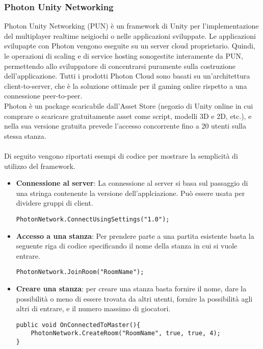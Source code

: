 \subsubsection{Photon Unity Networking}
Photon Unity Networking (PUN) \`e un framework di Unity per l'implementazione del multiplayer realtime neigiochi o nelle applicazioni sviluppate. Le applicazioni svilupapte con Photon vengono eseguite su un server cloud proprietario. Quindi, le operazioni di scaling e di service hosting sonogestite interamente da PUN, permettendo allo sviluppatore di concentrarsi puramente sulla costruzione dell'applicazione. Tutti i prodotti Photon Cloud sono basati su un'architettura client-to-server, che \`e la soluzione ottimale per il gaming onlire rispetto a una connessione peer-to-peer.\\
Photon \`e un package scaricabile dall'Asset Store (negozio di Unity online in cui comprare o scaricare gratuitamente asset come script, modelli 3D e 2D, etc.), e nella sua versione gratuita prevede l'accesso concorrente fino a 20 utenti sulla stessa stanza. \\\\
Di seguito vengono riportati esempi di codice per mostrare la semplicit\`a di utilizzo del framework.\\
\begin{itemize}
	\item \textbf{Connessione al server}: La connessione al server si basa sul passaggio di una stringa contenente la versione dell'applciazione. Pu\`o essere usata per dividere gruppi di client.
\begin{lstlisting}
PhotonNetwork.ConnectUsingSettings("1.0");
\end{lstlisting}

	\item \textbf{Accesso a una stanza}: Per prendere parte a una partita esistente basta la seguente riga di codice specificando il nome della stanza in cui si vuole entrare.
\begin{lstlisting}
PhotonNetwork.JoinRoom("RoomName");
\end{lstlisting}

	\item \textbf{Creare una stanza}: per creare una stanza basta fornire il nome, dare la possibilit\`a o meno di essere trovata da altri utenti, fornire la possibilit\`a agli altri di entrare, e il numero massimo di giocatori.
\begin{lstlisting}
public void OnConnectedToMaster(){
	PhotonNetwork.CreateRoom("RoomName", true, true, 4);
}

\end{lstlisting}	
	
\end{itemize}

